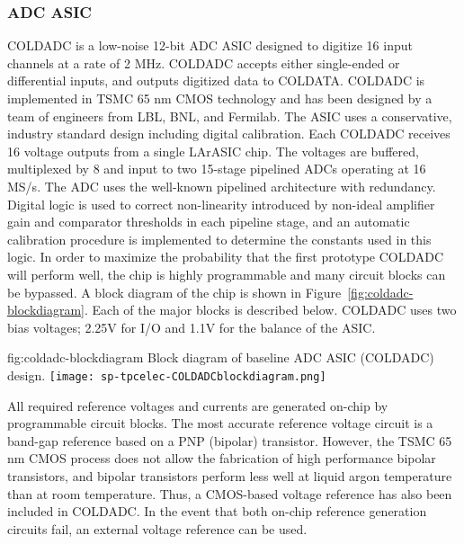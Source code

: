 \subsubsection{ADC ASIC}
\label{sec:fdsp-tpcelec-design-femb-adc}

COLDADC is a low-noise 12-bit ADC ASIC designed to digitize 16 input channels at a rate of 2 MHz.  COLDADC accepts either single-ended or differential inputs, and outputs digitized data to COLDATA.  COLDADC is implemented in TSMC 65 nm CMOS technology and has been designed by a team of engineers from LBL, BNL, and Fermilab.  The ASIC uses a conservative, industry standard design including digital calibration.  Each COLDADC receives 16 voltage outputs from a single LArASIC chip.  The voltages are buffered, multiplexed by 8 and input to two 15-stage pipelined ADCs operating at 16 MS/s.  The ADC uses the well-known pipelined architecture with redundancy\cite{PipelinedADC}\cite{CalibrationCorrection}.  Digital logic is used to correct non-linearity introduced by non-ideal amplifier gain and comparator thresholds in each pipeline stage, and an automatic calibration procedure is implemented to determine the constants used in this logic.  In order to maximize the probability that the first prototype COLDADC will perform well, the chip is highly programmable and many circuit blocks can be bypassed.  A block diagram of the chip is shown in Figure~\ref{fig:coldadc-blockdiagram}.  Each of the major blocks is described below.  COLDADC uses two bias voltages; 2.25V for I/O and 1.1V for the balance of the ASIC.

\begin{dunefigure}
{fig:coldadc-blockdiagram}
{Block diagram of baseline ADC ASIC (COLDADC) design.}
\texttt{[image: sp-tpcelec-COLDADCblockdiagram.png]}
\end{dunefigure}


All required reference voltages and currents are generated on-chip by programmable circuit blocks.  The most accurate reference voltage circuit is a band-gap reference based on a PNP (bipolar) transistor.  However, the TSMC 65 nm CMOS process does not allow the fabrication of high performance bipolar transistors, and bipolar transistors perform less well at liquid argon temperature than at room temperature.  Thus, a CMOS-based voltage reference has also been included in COLDADC.  In the event that both on-chip reference generation circuits fail, an external voltage reference can be used.

